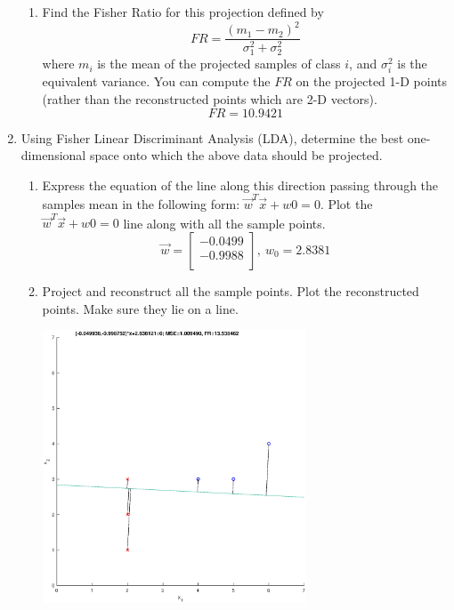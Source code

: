 \documentclass[letterpaper,10pt]{article}
\begin{document}
\begin{enumerate}
\begin{enumerate}
	\item Find the Fisher Ratio for this projection defined by
	$$FR=\frac{(m_1-m_2)^2}{\sigma_1^2+\sigma_2^2}$$
	where $m_i$ is the mean of the projected samples of class $i$, and $\sigma_i^2$ is the equivalent variance. You can compute the $FR$ on the projected 1-D points (rather than the reconstructed points which are 2-D vectors).
	$$FR=10.9421$$
	
\end{enumerate}

\item Using Fisher Linear Discriminant Analysis (LDA), determine the best one-dimensional space onto which the above data should be projected.\\

\begin{enumerate}
	\item Express the equation of the line along this direction passing
	through the samples mean in the following form: $\vec{w}^T\vec{x}+w0 = 0$. Plot
	the $\vec{w}^T\vec{x} + w0 = 0$ line along with all the sample points.
	$$\vec{w}=\left[\begin{array}{c}
		 -0.0499 \\
		    -0.9988 \\
		\end{array}\right],~w_0=2.8381$$
	
	\item Project and reconstruct all the sample points. Plot the reconstructed points. Make sure they lie on a line.\\
	\begin{center}
		\includegraphics[width=0.65\textwidth]{./matlab/LDA.eps}
	\end{center}
	

\end{enumerate}
\end{enumerate}
\end{document}
